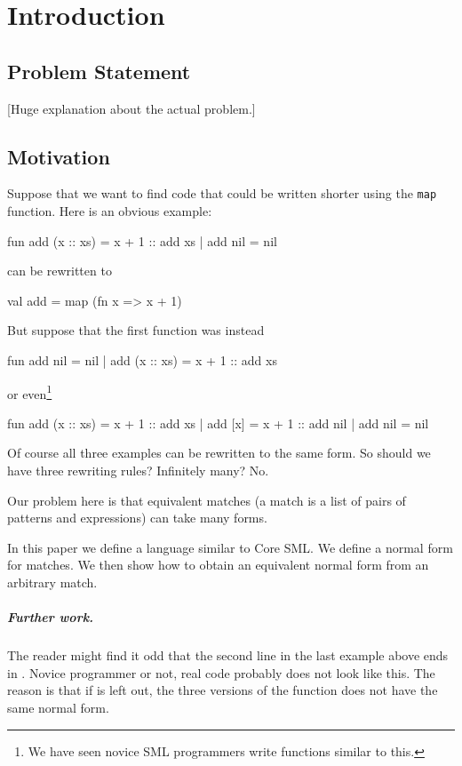 \chapter{Introduction}

\section{Problem Statement}

{\footnotesize [Huge explanation about the actual problem.]}

\section{Motivation}
\label{sec:motivation}
Suppose that we want to find code that could be written shorter using the
\texttt{map} function.
Here is an obvious example:
\begin{sml}
fun add (x :: xs) = x + 1 :: add xs
  | add nil       = nil
\end{sml}
can be rewritten to
\begin{sml}
val add = map (fn x => x + 1)
\end{sml}

But suppose that the first function was instead
\begin{sml}
fun add nil       = nil
  | add (x :: xs) = x + 1 :: add xs
\end{sml}
or even\footnote{We have seen novice SML programmers write functions similar to
  this.}
\begin{sml}
fun add (x :: xs) = x + 1 :: add xs
  | add [x]       = x + 1 :: add nil
  | add nil       = nil
\end{sml}
Of course all three examples can be rewritten to the same form. So should we
have three rewriting rules? Infinitely many? No.

Our problem here is that equivalent matches (a match is a list of pairs of
patterns and expressions) can take many forms.

In this paper we define a language similar to Core SML. We define a
normal form for matches. We then show how to obtain an equivalent normal form
from an arbitrary match.

\paragraph{Further work.}
The reader might find it odd that the second line in the last example above ends
in . Novice programmer or not, real code probably does not
look like this. The reason is that if  is left out, the three
versions of the function  does not have the same normal form.

